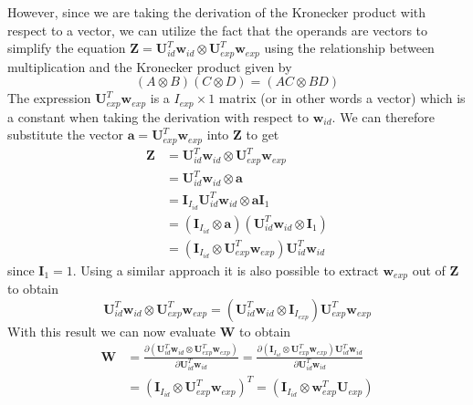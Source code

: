 \documentclass[11pt,a4paper,twoside]{report}
\begin{document}
However, since we are taking the derivation of the Kronecker product with
respect to a vector, we can utilize the fact that the operands are vectors to simplify the equation $\mathbf{Z} =
\mathbf{U}_{id}^T\mathbf{w}_{id} \otimes
\mathbf{U}_{exp}^T\mathbf{w}_{exp}$ using the relationship between
multiplication and the Kronecker product given by 
\begin{equation*}
(A \otimes B)(C \otimes D) = (AC \otimes BD)
\end{equation*}
The expression $\mathbf{U}_{exp}^T\mathbf{w}_{exp}$ is a $I_{exp} \times
1$ matrix (or in other words a vector) which is a constant when
taking the derivation with respect to $\mathbf{w}_{id}$. We can therefore
substitute the vector $\mathbf{a} = \mathbf{U}_{exp}^T\mathbf{w}_{exp}$ into $\mathbf{Z}$
to get 
\begin{align}
\mathbf{Z} &= \mathbf{U}_{id}^T\mathbf{w}_{id} \otimes
\mathbf{U}_{exp}^T\mathbf{w}_{exp}\nonumber\\
& = \mathbf{U}_{id}^T\mathbf{w}_{id} \otimes
\mathbf{a}\nonumber\\
&= \mathbf{I}_{I_{id}}\mathbf{U}_{id}^T\mathbf{w}_{id} \otimes
\mathbf{a}\mathbf{I}_1 \nonumber\\
&= (\mathbf{I}_{I_{id}} \otimes \mathbf{a})(\mathbf{U}_{id}^T\mathbf{w}_{id}
\otimes \mathbf{I}_1)\nonumber\\
\label{eq:opt1}
&=(\mathbf{I}_{I_{id}} \otimes \mathbf{U}_{exp}^T\mathbf{w}_{exp})\mathbf{U}_{id}^T\mathbf{w}_{id}
\end{align}
since $\mathbf{I}_1 = 1$. Using a similar approach it is also possible to extract
$\mathbf{w}_{exp}$ out of $\mathbf{Z}$ to obtain
\begin{equation}\label{eq:opt2}
\mathbf{U}_{id}^T\mathbf{w}_{id} \otimes
\mathbf{U}_{exp}^T\mathbf{w}_{exp} = (\mathbf{U}_{id}^T\mathbf{w}_{id} \otimes
\mathbf{I}_{I_{exp}})\mathbf{U}_{exp}^T\mathbf{w}_{exp} 
\end{equation}
With this result we can now evaluate $\mathbf{W}$ to obtain
\begin{align*}
\mathbf{W} &= 
\frac
{\partial
(\mathbf{U}_{id}^T\mathbf{w}_{id} \otimes \mathbf{U}_{exp}^T\mathbf{w}_{exp})
}
{\partial
\mathbf{U}_{id}^T\mathbf{w}_{id}
}= 
\frac
{\partial
(\mathbf{I}_{I_{id}} \otimes \mathbf{U}_{exp}^T\mathbf{w}_{exp})\mathbf{U}_{id}^T\mathbf{w}_{id}
}
{\partial
\mathbf{U}_{id}^T\mathbf{w}_{id}
}\\
&=(\mathbf{I}_{I_{id}} \otimes
\mathbf{U}_{exp}^T\mathbf{w}_{exp})^T =(\mathbf{I}_{I_{id}} \otimes
\mathbf{w}_{exp}^T\mathbf{U}_{exp})
\end{align*}
\end{document}
